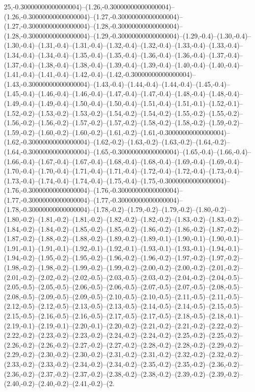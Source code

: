 25,-0.30000000000000004)--(1.26,-0.30000000000000004)--(1.26,-0.30000000000000004)--(1.27,-0.30000000000000004)--(1.27,-0.30000000000000004)--(1.28,-0.30000000000000004)--(1.28,-0.30000000000000004)--(1.29,-0.30000000000000004)--(1.29,-0.4)--(1.30,-0.4)--(1.30,-0.4)--(1.31,-0.4)--(1.31,-0.4)--(1.32,-0.4)--(1.32,-0.4)--(1.33,-0.4)--(1.33,-0.4)--(1.34,-0.4)--(1.34,-0.4)--(1.35,-0.4)--(1.35,-0.4)--(1.36,-0.4)--(1.36,-0.4)--(1.37,-0.4)--(1.37,-0.4)--(1.38,-0.4)--(1.38,-0.4)--(1.39,-0.4)--(1.39,-0.4)--(1.40,-0.4)--(1.40,-0.4)--(1.41,-0.4)--(1.41,-0.4)--(1.42,-0.4)--(1.42,-0.30000000000000004)--(1.43,-0.30000000000000004)--(1.43,-0.4)--(1.44,-0.4)--(1.44,-0.4)--(1.45,-0.4)--(1.45,-0.4)--(1.46,-0.4)--(1.46,-0.4)--(1.47,-0.4)--(1.47,-0.4)--(1.48,-0.4)--(1.48,-0.4)--(1.49,-0.4)--(1.49,-0.4)--(1.50,-0.4)--(1.50,-0.4)--(1.51,-0.4)--(1.51,-0.1)--(1.52,-0.1)--(1.52,-0.2)--(1.53,-0.2)--(1.53,-0.2)--(1.54,-0.2)--(1.54,-0.2)--(1.55,-0.2)--(1.55,-0.2)--(1.56,-0.2)--(1.56,-0.2)--(1.57,-0.2)--(1.57,-0.2)--(1.58,-0.2)--(1.58,-0.2)--(1.59,-0.2)--(1.59,-0.2)--(1.60,-0.2)--(1.60,-0.2)--(1.61,-0.2)--(1.61,-0.30000000000000004)--(1.62,-0.30000000000000004)--(1.62,-0.2)--(1.63,-0.2)--(1.63,-0.2)--(1.64,-0.2)--(1.64,-0.30000000000000004)--(1.65,-0.30000000000000004)--(1.65,-0.4)--(1.66,-0.4)--(1.66,-0.4)--(1.67,-0.4)--(1.67,-0.4)--(1.68,-0.4)--(1.68,-0.4)--(1.69,-0.4)--(1.69,-0.4)--(1.70,-0.4)--(1.70,-0.4)--(1.71,-0.4)--(1.71,-0.4)--(1.72,-0.4)--(1.72,-0.4)--(1.73,-0.4)--(1.73,-0.4)--(1.74,-0.4)--(1.74,-0.4)--(1.75,-0.4)--(1.75,-0.30000000000000004)--(1.76,-0.30000000000000004)--(1.76,-0.30000000000000004)--(1.77,-0.30000000000000004)--(1.77,-0.30000000000000004)--(1.78,-0.30000000000000004)--(1.78,-0.2)--(1.79,-0.2)--(1.79,-0.2)--(1.80,-0.2)--(1.80,-0.2)--(1.81,-0.2)--(1.81,-0.2)--(1.82,-0.2)--(1.82,-0.2)--(1.83,-0.2)--(1.83,-0.2)--(1.84,-0.2)--(1.84,-0.2)--(1.85,-0.2)--(1.85,-0.2)--(1.86,-0.2)--(1.86,-0.2)--(1.87,-0.2)--(1.87,-0.2)--(1.88,-0.2)--(1.88,-0.2)--(1.89,-0.2)--(1.89,-0.1)--(1.90,-0.1)--(1.90,-0.1)--(1.91,-0.1)--(1.91,-0.1)--(1.92,-0.1)--(1.92,-0.1)--(1.93,-0.1)--(1.93,-0.1)--(1.94,-0.1)--(1.94,-0.2)--(1.95,-0.2)--(1.95,-0.2)--(1.96,-0.2)--(1.96,-0.2)--(1.97,-0.2)--(1.97,-0.2)--(1.98,-0.2)--(1.98,-0.2)--(1.99,-0.2)--(1.99,-0.2)--(2.00,-0.2)--(2.00,-0.2)--(2.01,-0.2)--(2.01,-0.2)--(2.02,-0.2)--(2.02,-0.5)--(2.03,-0.5)--(2.03,-0.2)--(2.04,-0.2)--(2.04,-0.5)--(2.05,-0.5)--(2.05,-0.5)--(2.06,-0.5)--(2.06,-0.5)--(2.07,-0.5)--(2.07,-0.5)--(2.08,-0.5)--(2.08,-0.5)--(2.09,-0.5)--(2.09,-0.5)--(2.10,-0.5)--(2.10,-0.5)--(2.11,-0.5)--(2.11,-0.5)--(2.12,-0.5)--(2.12,-0.5)--(2.13,-0.5)--(2.13,-0.5)--(2.14,-0.5)--(2.14,-0.5)--(2.15,-0.5)--(2.15,-0.5)--(2.16,-0.5)--(2.16,-0.5)--(2.17,-0.5)--(2.17,-0.5)--(2.18,-0.5)--(2.18,-0.1)--(2.19,-0.1)--(2.19,-0.1)--(2.20,-0.1)--(2.20,-0.2)--(2.21,-0.2)--(2.21,-0.2)--(2.22,-0.2)--(2.22,-0.2)--(2.23,-0.2)--(2.23,-0.2)--(2.24,-0.2)--(2.24,-0.2)--(2.25,-0.2)--(2.25,-0.2)--(2.26,-0.2)--(2.26,-0.2)--(2.27,-0.2)--(2.27,-0.2)--(2.28,-0.2)--(2.28,-0.2)--(2.29,-0.2)--(2.29,-0.2)--(2.30,-0.2)--(2.30,-0.2)--(2.31,-0.2)--(2.31,-0.2)--(2.32,-0.2)--(2.32,-0.2)--(2.33,-0.2)--(2.33,-0.2)--(2.34,-0.2)--(2.34,-0.2)--(2.35,-0.2)--(2.35,-0.2)--(2.36,-0.2)--(2.36,-0.2)--(2.37,-0.2)--(2.37,-0.2)--(2.38,-0.2)--(2.38,-0.2)--(2.39,-0.2)--(2.39,-0.2)--(2.40,-0.2)--(2.40,-0.2)--(2.41,-0.2)--(2.